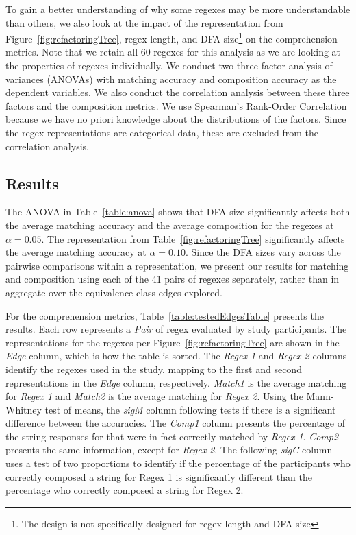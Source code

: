 To gain a better understanding of why some regexes may be more understandable than others, we also look at the impact of the representation from Figure~\ref{fig:refactoringTree}, regex length, and DFA size\footnote{The design is not specifically designed for regex length and DFA size} on the comprehension metrics.
Note that we retain all 60 regexes for this analysis as we are looking at the properties of regexes individually.
We conduct two three-factor analysis of variances (ANOVAs) with matching accuracy and composition accuracy as the dependent variables.
We also conduct the correlation analysis between these three factors and the composition metrics.
We use Spearman's Rank-Order Correlation because we have no priori knowledge about the distributions of the factors.
Since the regex representations are categorical data, these are excluded from the correlation analysis.



\subsection{Results}
The ANOVA in Table~\ref{table:anova} shows that DFA size significantly affects both the average matching accuracy and the average composition for the regexes at $\alpha = 0.05$.
The representation from Table~\ref{fig:refactoringTree} significantly affects the average matching accuracy at $\alpha = 0.10$.
Since the DFA sizes vary across the pairwise comparisons within a representation, we present our results for matching and composition using each of the 41 pairs of regexes separately, rather than in aggregate over the equivalence class edges explored. %




For the comprehension metrics, Table~\ref{table:testedEdgesTable} presents the results.
Each row represents a {\em Pair} of regex evaluated by study participants.
The representations for the regexes per Figure~\ref{fig:refactoringTree} are shown in the {\em Edge} column, which is how the table is sorted.
The {\em Regex 1} and {\em Regex 2} columns identify the regexes used in the study, mapping to the first and second representations in the {\em Edge} column, respectively.
{\em Match1} is the average matching for {\em Regex 1} and {\em Match2} is the average matching for {\em Regex 2}.
Using the Mann-Whitney test of means, the {\em sigM} column following tests if there is a significant difference between the accuracies.
The {\em Comp1} column presents the percentage of the string responses for that were in fact correctly matched by {\em Regex 1}. {\em Comp2} presents the same information, except for {\em Regex 2}.
The following {\em sigC} column uses a test of two proportions to identify if the percentage of the participants who correctly composed a string for Regex 1 is significantly different than the percentage who correctly composed a string for {Regex 2}.


